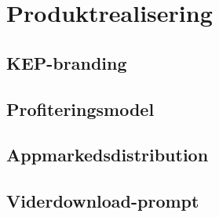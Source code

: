 \section{Produktrealisering \label{sec:produktrealisering}}

\subsection{KEP-branding}
\subsection{Profiteringsmodel}
\subsection{Appmarkedsdistribution}
\subsection{Viderdownload-prompt}

